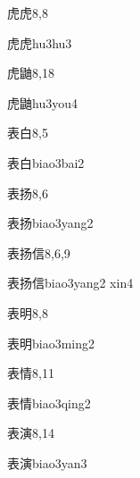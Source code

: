 \begin{entry}{虎虎}{8,8}
  \begin{phonetics}{虎虎}{hu3hu3}
  \end{phonetics}
\end{entry}

\begin{entry}{虎鼬}{8,18}
  \begin{phonetics}{虎鼬}{hu3you4}
  \end{phonetics}
\end{entry}

\begin{entry}{表白}{8,5}
  \begin{phonetics}{表白}{biao3bai2}
  \end{phonetics}
\end{entry}

\begin{entry}{表扬}{8,6}
  \begin{phonetics}{表扬}{biao3yang2}
  \end{phonetics}
\end{entry}

\begin{entry}{表扬信}{8,6,9}
  \begin{phonetics}{表扬信}{biao3yang2 xin4}
  \end{phonetics}
\end{entry}

\begin{entry}{表明}{8,8}
  \begin{phonetics}{表明}{biao3ming2}
  \end{phonetics}
\end{entry}

\begin{entry}{表情}{8,11}
  \begin{phonetics}{表情}{biao3qing2}
  \end{phonetics}
\end{entry}

\begin{entry}{表演}{8,14}
  \begin{phonetics}{表演}{biao3yan3}
  \end{phonetics}
\end{entry}

